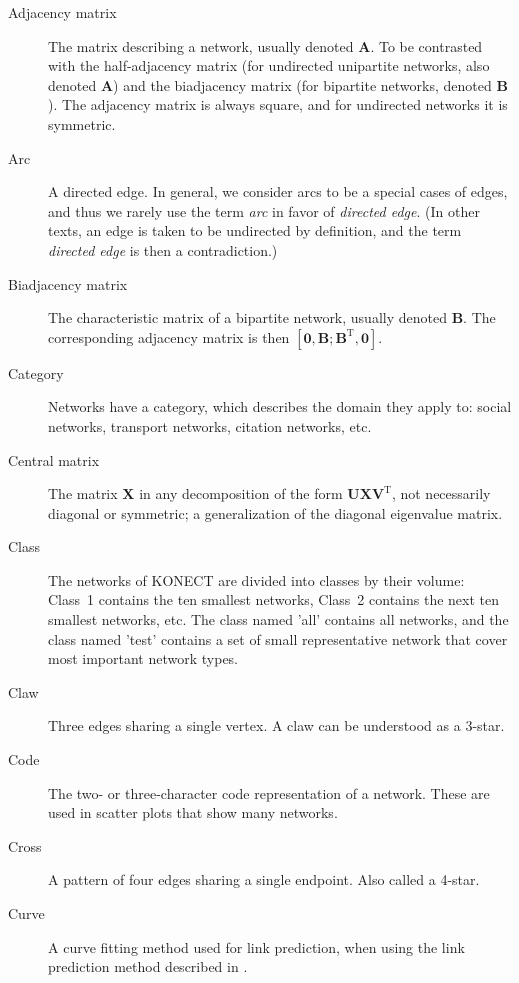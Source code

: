 \documentclass{article}
\begin{document}
\begin{description}
  \item[Adjacency matrix]
    The matrix describing a network, usually denoted $\mathbf A$.  To be
    contrasted with the 
    half-adjacency matrix (for undirected unipartite networks, also
    denoted $\mathbf A$) and the
    biadjacency matrix (for bipartite networks, denoted $\mathbf B$). 
    The adjacency matrix is always square, and for undirected networks
    it is symmetric. 
  \item[Arc] A directed edge.  In general, we consider arcs to be a
    special cases of edges, and thus we rarely use the term \emph{arc}
    in favor of \emph{directed edge}.  (In other texts, an edge is taken
    to be undirected by definition, and the term \emph{directed edge} is
    then a contradiction.)
  \item[Biadjacency matrix]
    The characteristic matrix of a bipartite network, usually denoted
    $\mathbf B$.  The corresponding adjacency matrix is then $[\mathbf
      0, \mathbf B; \mathbf B^{\mathrm T}, \mathbf 0]$. 
  \item[Category] Networks have a category, which describes the domain
    they apply to:  social networks, transport networks, citation
    networks, etc. 
  \item[Central matrix] The matrix $\mathbf X$ in any decomposition
    of the form $\mathbf U \mathbf X \mathbf V^{\mathrm T}$, not necessarily
    diagonal or symmetric; a generalization of the diagonal eigenvalue
    matrix.
  \item[Class]
    The networks of KONECT are divided into classes by their volume:
    Class~1 contains the ten smallest networks, Class~2 contains the
    next ten smallest networks, etc.  The class named 'all' contains all
    networks, and the class named 'test' contains a set of small
    representative network that cover most important network types. 
  \item[Claw]
    Three edges sharing a single vertex.  A claw can be understood as a 3-star. 
  \item[Code]
    The two- or three-character code representation of a network.  These
    are used in scatter plots that show many networks.  
  \item[Cross]
    A pattern of four edges sharing a single endpoint.  Also called a
    4-star.  
  \item[Curve]
    A curve fitting method used for link prediction, when using the link
    prediction method described
    in \citep{kunegis:spectral-transformation}.

\end{description}
\end{document}
